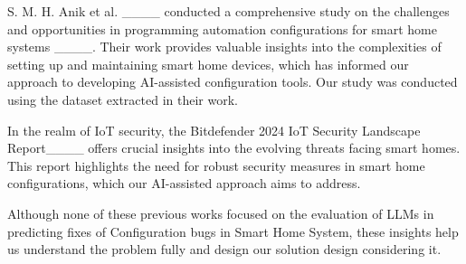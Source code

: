 S. M. H. Anik et al. ____ conducted a comprehensive study on the challenges and opportunities in programming automation configurations for smart home systems ____. Their work provides valuable insights into the complexities of setting up and maintaining smart home devices, which has informed our approach to developing AI-assisted configuration tools. Our study was conducted using the dataset extracted in their work.

In the realm of IoT security, the Bitdefender 2024 IoT Security Landscape Report____ offers crucial insights into the evolving threats facing smart homes. This report highlights the need for robust security measures in smart home configurations, which our AI-assisted approach aims to address.
 
Although none of these previous works focused on the evaluation of LLMs in predicting
fixes of Configuration bugs in Smart Home System, these insights help us understand the problem fully and design our solution design considering it.